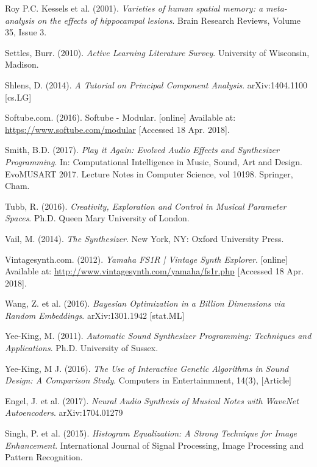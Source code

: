 \documentclass[11pt, oneside]{report}   	%
\begin{document}
{\begin{thebibliography}{9}
Roy P.C. Kessels et al. (2001). \emph{Varieties of human spatial memory: a meta-analysis on the effects of hippocampal lesions}.
Brain Research Reviews,
Volume 35, Issue 3.

Settles, Burr. (2010). \emph{Active Learning Literature Survey}. University of Wisconsin, Madison.

Shlens, D. (2014). \emph{A Tutorial on Principal Component Analysis}. arXiv:1404.1100 [cs.LG]

Softube.com. (2016). Softube - Modular. [online] Available at: \url{https://www.softube.com/modular} [Accessed 18 Apr. 2018].

Smith, B.D. (2017). \emph{Play it Again: Evolved Audio Effects and Synthesizer Programming}. In: Computational Intelligence in Music, Sound, Art and Design. EvoMUSART 2017. Lecture Notes in Computer Science, vol 10198. Springer, Cham.

Tubb, R. (2016). \emph{Creativity, Exploration and Control in Musical Parameter Spaces}. Ph.D. Queen Mary University of London.

Vail, M. (2014). \emph{The Synthesizer}. New York, NY: Oxford University Press.

Vintagesynth.com. (2012). \emph{Yamaha FS1R | Vintage Synth Explorer}. [online] Available at: \url{http://www.vintagesynth.com/yamaha/fs1r.php} [Accessed 18 Apr. 2018].

Wang, Z. et al. (2016). \emph{Bayesian Optimization in a Billion Dimensions via Random Embeddings}. arXiv:1301.1942 [stat.ML]

Yee-King, M. (2011). \emph{Automatic Sound Synthesizer Programming: Techniques and Applications}. Ph.D. University of Sussex.

Yee-King, M J. (2016). \emph{The Use of Interactive Genetic Algorithms in Sound Design: A Comparison Study}. Computers in Entertainmnent, 14(3), [Article]

 Engel, J. et al. (2017). \emph{Neural Audio Synthesis of Musical Notes with WaveNet Autoencoders}. arXiv:1704.01279 

Singh, P. et al. (2015). \emph{Histogram Equalization: A Strong Technique for Image Enhancement}. International Journal of Signal Processing, Image Processing and Pattern Recognition. %


\end{thebibliography}}
\end{document}
